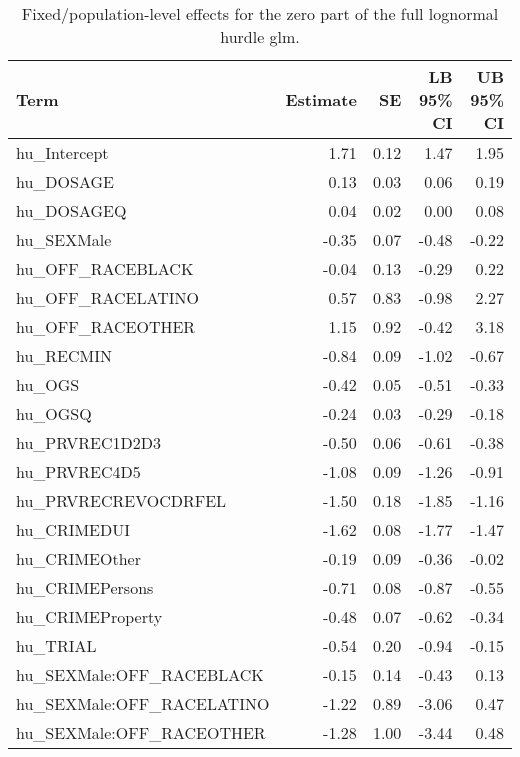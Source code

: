 \documentclass[
  letterpaper,
  DIV=11,
  numbers=noendperiod]{scrartcl}
\begin{document}
\hypertarget{tbl-brms-hurdle-model-summary-2-zero}{}
\begin{table}
\caption{\label{tbl-brms-hurdle-model-summary-2-zero}Fixed/population-level effects for the zero part of the full lognormal
hurdle glm. }\tabularnewline

\centering
\begin{tabular}{lrrrr}
\toprule
Term & Estimate & SE & LB 95\% CI & UB 95\% CI\\
\midrule
hu\_Intercept & 1.71 & 0.12 & 1.47 & 1.95\\
hu\_DOSAGE & 0.13 & 0.03 & 0.06 & 0.19\\
hu\_DOSAGEQ & 0.04 & 0.02 & 0.00 & 0.08\\
hu\_SEXMale & -0.35 & 0.07 & -0.48 & -0.22\\
hu\_OFF\_RACEBLACK & -0.04 & 0.13 & -0.29 & 0.22\\
\addlinespace
hu\_OFF\_RACELATINO & 0.57 & 0.83 & -0.98 & 2.27\\
hu\_OFF\_RACEOTHER & 1.15 & 0.92 & -0.42 & 3.18\\
hu\_RECMIN & -0.84 & 0.09 & -1.02 & -0.67\\
hu\_OGS & -0.42 & 0.05 & -0.51 & -0.33\\
hu\_OGSQ & -0.24 & 0.03 & -0.29 & -0.18\\
\addlinespace
hu\_PRVREC1D2D3 & -0.50 & 0.06 & -0.61 & -0.38\\
hu\_PRVREC4D5 & -1.08 & 0.09 & -1.26 & -0.91\\
hu\_PRVRECREVOCDRFEL & -1.50 & 0.18 & -1.85 & -1.16\\
hu\_CRIMEDUI & -1.62 & 0.08 & -1.77 & -1.47\\
hu\_CRIMEOther & -0.19 & 0.09 & -0.36 & -0.02\\
\addlinespace
hu\_CRIMEPersons & -0.71 & 0.08 & -0.87 & -0.55\\
hu\_CRIMEProperty & -0.48 & 0.07 & -0.62 & -0.34\\
hu\_TRIAL & -0.54 & 0.20 & -0.94 & -0.15\\
hu\_SEXMale:OFF\_RACEBLACK & -0.15 & 0.14 & -0.43 & 0.13\\
hu\_SEXMale:OFF\_RACELATINO & -1.22 & 0.89 & -3.06 & 0.47\\
\addlinespace
hu\_SEXMale:OFF\_RACEOTHER & -1.28 & 1.00 & -3.44 & 0.48\\
\bottomrule
\end{tabular}
\end{table}
\end{document}
